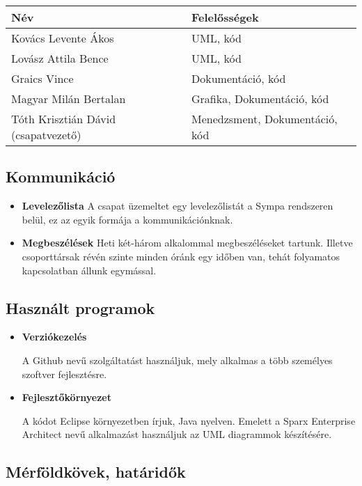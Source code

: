 \begin{longtable}{| l | l |}
\hline
\textbf{Név}   & \textbf{Felelősségek}  \tabularnewline
\hline
\hline Kovács Levente Ákos & UML, kód  \tabularnewline
\hline Lovász Attila Bence & UML, kód  \tabularnewline
\hline Graics Vince & Dokumentáció, kód  \tabularnewline
\hline Magyar Milán Bertalan & Grafika, Dokumentáció, kód  \tabularnewline
\hline Tóth Krisztián Dávid (csapatvezető) & Menedzsment, Dokumentáció, kód  \tabularnewline
\hline
\end{longtable}

\subsection {Kommunikáció}
\begin{itemize}
\item \textbf{Levelezőlista}
A csapat üzemeltet egy levelezőlistát a Sympa rendszeren belül, ez az egyik formája a kommunikációnknak. 
\item \textbf{Megbeszélések}
Heti két-három alkalommal megbeszéléseket tartunk. Illetve csoporttársak révén szinte minden óránk egy időben van, tehát folyamatos kapcsolatban állunk egymással.
\end{itemize}

\subsection{Használt programok}
\begin{itemize}
\item \textbf{Verziókezelés}

A Github nevű szolgáltatást használjuk, mely alkalmas a több személyes szoftver fejlesztésre. 

\item \textbf{Fejlesztőkörnyezet}


A kódot Eclipse környezetben írjuk, Java nyelven. Emelett a Sparx Enterprise Architect nevű alkalmazást használjuk az UML diagrammok készítésére.
\end{itemize}
\subsection{Mérföldkövek, határidők}


